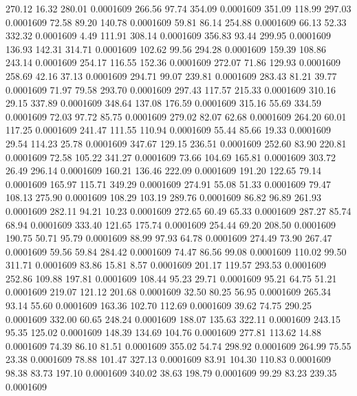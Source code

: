  270.12   16.32  280.01   0.0001609
 266.56   97.74  354.09   0.0001609
 351.09  118.99  297.03   0.0001609
  72.58   89.20  140.78   0.0001609
  59.81   86.14  254.88   0.0001609
  66.13   52.33  332.32   0.0001609
   4.49  111.91  308.14   0.0001609
 356.83   93.44  299.95   0.0001609
 136.93  142.31  314.71   0.0001609
 102.62   99.56  294.28   0.0001609
 159.39  108.86  243.14   0.0001609
 254.17  116.55  152.36   0.0001609
 272.07   71.86  129.93   0.0001609
 258.69   42.16   37.13   0.0001609
 294.71   99.07  239.81   0.0001609
 283.43   81.21   39.77   0.0001609
  71.97   79.58  293.70   0.0001609
 297.43  117.57  215.33   0.0001609
 310.16   29.15  337.89   0.0001609
 348.64  137.08  176.59   0.0001609
 315.16   55.69  334.59   0.0001609
  72.03   97.72   85.75   0.0001609
 279.02   82.07   62.68   0.0001609
 264.20   60.01  117.25   0.0001609
 241.47  111.55  110.94   0.0001609
  55.44   85.66   19.33   0.0001609
  29.54  114.23   25.78   0.0001609
 347.67  129.15  236.51   0.0001609
 252.60   83.90  220.81   0.0001609
  72.58  105.22  341.27   0.0001609
  73.66  104.69  165.81   0.0001609
 303.72   26.49  296.14   0.0001609
 160.21  136.46  222.09   0.0001609
 191.20  122.65   79.14   0.0001609
 165.97  115.71  349.29   0.0001609
 274.91   55.08   51.33   0.0001609
  79.47  108.13  275.90   0.0001609
 108.29  103.19  289.76   0.0001609
  86.82   96.89  261.93   0.0001609
 282.11   94.21   10.23   0.0001609
 272.65   60.49   65.33   0.0001609
 287.27   85.74   68.94   0.0001609
 333.40  121.65  175.74   0.0001609
 254.44   69.20  208.50   0.0001609
 190.75   50.71   95.79   0.0001609
  88.99   97.93   64.78   0.0001609
 274.49   73.90  267.47   0.0001609
  59.56   59.84  284.42   0.0001609
  74.47   86.56   99.08   0.0001609
 110.02   99.50  311.71   0.0001609
  83.86   15.81    8.57   0.0001609
 201.17  119.57  293.53   0.0001609
 252.86  109.88  197.81   0.0001609
 108.44   95.23   29.71   0.0001609
  95.21   64.75   51.21   0.0001609
 219.07  121.12  201.68   0.0001609
  32.50   80.25   56.95   0.0001609
 265.34   93.14   55.60   0.0001609
 163.36  102.70  112.69   0.0001609
  39.62   74.75  290.25   0.0001609
 332.00   60.65  248.24   0.0001609
 188.07  135.63  322.11   0.0001609
 243.15   95.35  125.02   0.0001609
 148.39  134.69  104.76   0.0001609
 277.81  113.62   14.88   0.0001609
  74.39   86.10   81.51   0.0001609
 355.02   54.74  298.92   0.0001609
 264.99   75.55   23.38   0.0001609
  78.88  101.47  327.13   0.0001609
  83.91  104.30  110.83   0.0001609
  98.38   83.73  197.10   0.0001609
 340.02   38.63  198.79   0.0001609
  99.29   83.23  239.35   0.0001609
